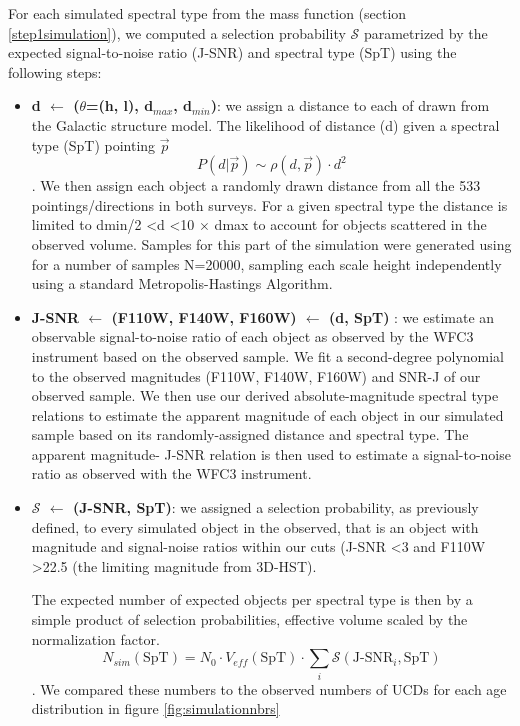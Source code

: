 \documentclass[manuscript]{aastex63}
\begin{document}
For each simulated spectral type from the mass function (section \ref{step1simulation}), we computed a selection probability $\mathcal{S}$ parametrized by the expected signal-to-noise ratio (J-SNR) and spectral type (SpT) using the following steps:
\begin{itemize}
\item \textbf{ d $\leftarrow$ ($\theta$=(h, l), d$_{max}$, d$_{min}$)}: we assign a distance to each of drawn from the Galactic structure model. The likelihood of distance (d) given a spectral type  (SpT) pointing $\vec{p}$ \begin{equation}  P(d|\vec{p}) \sim \rho (d, \vec{p}) \cdot d^2 \end{equation}. We then assign each object a randomly drawn distance from all the 533 pointings/directions in both surveys. For a given spectral type the distance is limited to dmin/2 \textless d \textless 10 $\times$ dmax to account for objects scattered in the observed volume. Samples for this part of the simulation were generated using  for a number of samples N=20000, sampling each scale height independently using a standard Metropolis-Hastings Algorithm.

\item \textbf{J-SNR  $\leftarrow$  (F110W, F140W, F160W) $\leftarrow$ (d, SpT) }: we estimate an observable signal-to-noise ratio of each object as observed by the WFC3 instrument based on the observed sample. We fit a second-degree polynomial to the observed magnitudes (F110W, F140W, F160W)  and SNR-J of our observed sample. We then use our derived absolute-magnitude spectral type relations to estimate the apparent magnitude of each object in our simulated sample based on its randomly-assigned distance and spectral type. The apparent magnitude- J-SNR relation is then used to estimate a signal-to-noise ratio as observed with the WFC3 instrument. 

\item \textbf{ $\mathcal{S}$  $\leftarrow$ (J-SNR, SpT)}: we assigned a selection probability, as previously defined, to every simulated object in the observed, that is an object with magnitude and signal-noise ratios within our cuts (J-SNR \textless 3 and F110W \textgreater 22.5 (the limiting magnitude from 3D-HST). 

The expected number of expected objects per spectral type is then by a simple product of selection probabilities, effective volume scaled by the normalization factor. 
\begin{equation}
N_{sim}(\text{SpT})= N_0 \cdot V_{eff} (\text{SpT}) \cdot \sum _i \mathcal{S}(\text{J-SNR}_i, \text{SpT}) \end{equation}. We compared these numbers to the observed numbers of UCDs for each age distribution in figure \ref{fig:simulationnbrs}

\end{itemize}
\end{document}
